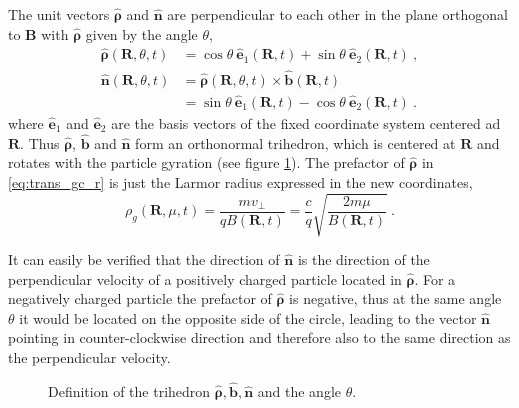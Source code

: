 \documentclass{scrartcl}
\renewcommand{\vec}[1]{\boldsymbol{#1}}
\newcommand{\uv}[1]{\hat{\vec{#1}}}
\newcommand{\rvgc}{\vec{R}} %
\begin{document}
The unit vectors $\uv{\rho}$ and $\uv{n}$ are perpendicular to each other in the plane orthogonal to $\vec{B}$ with $\uv{\rho}$ given by the angle $\theta$,
\begin{align}
\uv{\rho}(\rvgc,\theta,t) &= \cos\theta\ \uv{e}_1(\rvgc,t) + \sin\theta\ \uv{e}_2(\rvgc,t) \ , \label{eq:def_rho}\\
\uv{n}(\rvgc,\theta,t) &= \uv{\rho}(\rvgc,\theta,t)\times\uv{b}(\rvgc,t) \nonumber\\
&= \sin\theta\ \uv{e}_1(\rvgc,t) - \cos\theta\ \uv{e}_2(\rvgc,t) \label{eq:def_n} \ .
\end{align}
where $\uv{e}_1$ and $\uv{e}_2$ are the basis vectors of the fixed coordinate system centered ad $\rvgc$. Thus $\uv{\rho}$, $\uv{b}$ and $\uv{n}$ form an orthonormal trihedron, which is centered at $\rvgc$ and rotates with the particle gyration (see figure \ref{fig:trihedron}). The prefactor of $\uv{\rho}$ in \eqref{eq:trans_gc_r} is just the Larmor radius expressed in the new coordinates,
\begin{equation}\label{eq:larmor_radius}
\rho_g(\rvgc,\mu,t) = \frac{m v_\perp}{q B(\rvgc,t)} = \frac{c}{q}\sqrt{\frac{2m\mu}{B(\rvgc,t)}} \ .
\end{equation}

It can easily be verified that the direction of $\uv{n}$ is the direction of the perpendicular velocity of a positively charged particle located in $\uv{\rho}$. For a negatively charged particle the prefactor of $\uv{\rho}$ is negative, thus at the same angle $\theta$ it would be located on the opposite side of the circle, leading to the vector $\uv{n}$ pointing in counter-clockwise direction and therefore also to the same direction as the perpendicular velocity.

\begin{figure}[htbp]
\centering
{}
\caption{Definition of the trihedron $\uv{\rho}, \uv{b}, \uv{n}$ and the angle $\theta$.}
\label{fig:trihedron}
\end{figure}
\end{document}
